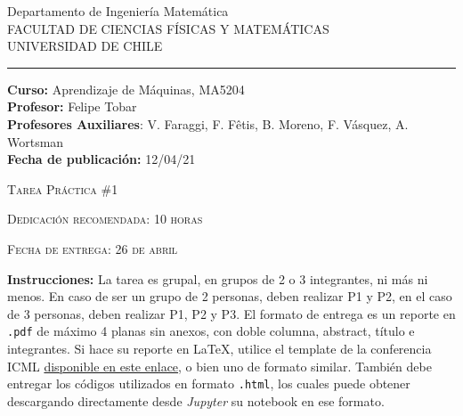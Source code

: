 \documentclass[letterpaper,11pt]{article}
\theoremstyle{plain}
\theoremstyle{definition}
\newcommand{\1}{\mathbbm{1}}
\begin{document}
\begin{minipage}{4cm}
\thispagestyle{empty}
\end{minipage}


\begin{minipage}{15cm}
\textsf{\small Departamento de Ingenier\'ia Matem\'atica}\\
\textsf{\tiny FACULTAD  DE  CIENCIAS F\'ISICAS Y MATEM\'ATICAS}\\
\textsf{\tiny UNIVERSIDAD  DE  CHILE}
\par\noindent\rule{\textwidth}{0.4pt}
\textsf{\footnotesize {\textbf{Curso:} Aprendizaje de Máquinas, MA5204}}\\
\textsf{\footnotesize {\textbf{Profesor:} Felipe Tobar}}\\
\textsf{\footnotesize {\textbf{Profesores Auxiliares}: V. Faraggi, F. Fêtis, B. Moreno, F. Vásquez, A. Wortsman}}\\
\textsf{\footnotesize {\textbf{Fecha de publicación:} 12/04/21}}\\
\end{minipage}
\begin{center}\textsc{Tarea Práctica \#1}\end{center}
\begin{center}\textsc{Dedicación recomendada: 10 horas}\end{center}
\begin{center}\textsc{Fecha de entrega: 26 de abril}\end{center}
\begin{flushleft}
\textbf{Instrucciones:} La tarea es grupal, en grupos de 2 o 3 integrantes, ni más ni menos. En caso de ser un grupo de 2 personas, deben realizar P1 y P2, en el caso de 3 personas, deben realizar P1, P2 y P3. El formato de entrega es un reporte en \texttt{.pdf} de máximo 4 planas sin anexos, con doble columna, abstract, título e integrantes. Si hace su reporte en \LaTeX, utilice el template de la conferencia ICML  \href{https://es.overleaf.com/latex/templates/icml2021-template/dsftnbmjgyhv}{disponible en este enlace}, o bien uno de formato similar. También debe entregar los códigos utilizados en formato \texttt{.html}, los cuales puede obtener descargando directamente desde \textit{Jupyter} su notebook en ese formato. 
\end{flushleft}


\thispagestyle{empty}

\end{document}
